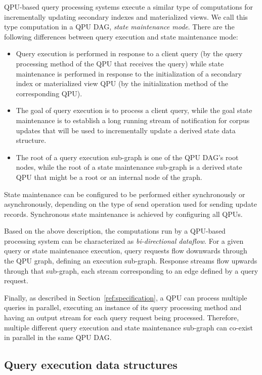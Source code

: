 QPU-based query processing systems execute a similar type of computations for incrementally updating
secondary indexes and materialized views.
We call this type computation in a QPU DAG, \textit{state maintenance mode}.
There are the following differences between query execution and state maintenance mode:
\begin{itemize}
  \item Query execution is performed in response to a client query (by the query processing method of the QPU that receives the query)
  while state maintenance is performed in response to the initialization of a secondary index or materialized view QPU
  (by the initialization method of the corresponding QPU).
  \item The goal of query execution is to process a client query,
  while the goal state maintenance is to establish a long running stream of notification for corpus updates that
  will be used to incrementally update a derived state data structure.
  \item The root of a query execution sub-graph is one of the QPU DAG's root nodes,
  while the root of a state maintenance sub-graph is a derived state QPU that might be a root or an internal node of the
  graph.
\end{itemize}

State maintenance can be configured to be performed either synchronously or asynchronously, depending on the type of send
operation used for sending update records.
Synchronous state maintenance is achieved by configuring all QPUs.

Based on the above description, the computations run by a QPU-based processing system can be characterized as
\textit{bi-directional dataflow}.
For a given query or state maintenance execution,
query requests flow downwards through the QPU graph, defining an execution sub-graph.
Response streams flow upwards through that sub-graph, each stream corresponding to an edge defined by a query request.

Finally, as described in Section~\ref{ref:specification}, a QPU can process multiple queries in parallel,
executing an instance of its query processing method and having an output stream for each query request being processed.
Therefore, multiple different query execution and state maintenance sub-graph can co-exist in parallel in the same QPU DAG.

\subsection{Query execution data structures}

